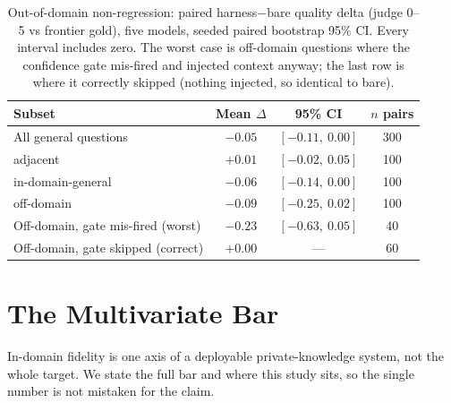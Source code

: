 \documentclass[11pt]{article}
\begin{document}
\begin{table}[t]\centering\small
\caption{Out-of-domain non-regression: paired harness$-$bare quality delta (judge 0--5 vs frontier
gold), five models, seeded paired bootstrap 95\% CI. Every interval includes zero. The worst case
is off-domain questions where the confidence gate mis-fired and injected context anyway; the last
row is where it correctly skipped (nothing injected, so identical to bare).}
\label{tab:ood}
\begin{tabular}{lccc}
\toprule
Subset & Mean $\Delta$ & 95\% CI & $n$ pairs \\
\midrule
All general questions              & $-0.05$ & $[-0.11,\ 0.00]$ & 300 \\
\quad adjacent                     & $+0.01$ & $[-0.02,\ 0.05]$ & 100 \\
\quad in-domain-general            & $-0.06$ & $[-0.14,\ 0.00]$ & 100 \\
\quad off-domain                   & $-0.09$ & $[-0.25,\ 0.02]$ & 100 \\
Off-domain, gate mis-fired (worst) & $-0.23$ & $[-0.63,\ 0.05]$ & 40 \\
Off-domain, gate skipped (correct) & $+0.00$ & ---              & 60 \\
\bottomrule
\end{tabular}
\end{table}

\section{The Multivariate Bar}\label{sec:multivariate}
In-domain fidelity is one axis of a deployable private-knowledge system, not the whole target.
We state the full bar and where this study sits, so the single number is not mistaken for the
claim.
\end{document}
